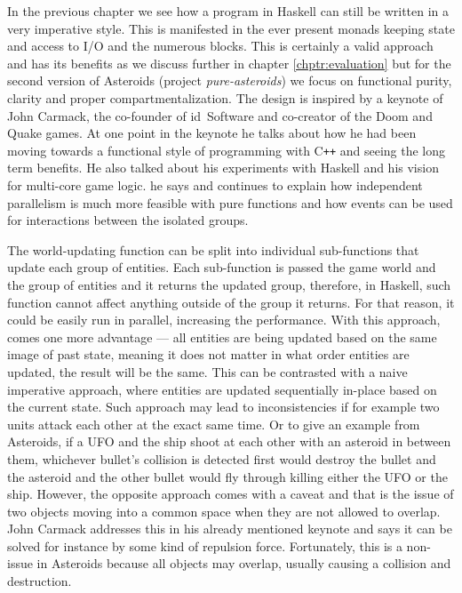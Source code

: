 \documentclass[
  digital, %
  color,   %
  table,   %
  oneside, %
  lof,     %
  lot,     %
]{fithesis3}
\newcommand{\cpp}{C\nolinebreak\texttt{+}\nolinebreak\texttt{+}}
\begin{document}
In the previous chapter we see how a program in Haskell can still be
written in a very imperative style. This is manifested in the ever present
monads keeping state and access to I/O and the numerous  blocks.
This is certainly a valid approach and has its benefits as we discuss
further in chapter \ref{chptr:evaluation} but for the second version of
Asteroids (project \emph{pure-asteroids}) we focus on functional purity,
clarity and proper compartmentalization.
The design is inspired by a keynote\cite{carmackkeynote} of John Carmack, the co-founder
of id~Software and co-creator of the Doom and Quake games.%
At one point in the keynote he talks about how he had been moving towards
a functional style of programming with \cpp{} and seeing the long term benefits.
He also talked about his experiments with Haskell and his vision for multi-core
game logic.  he says and
continues to explain how independent parallelism is much more feasible with pure
functions and how events can be used for interactions between the isolated groups.

The world-updating function can be split into individual sub-functions that update each group
of entities. Each sub-function is passed the game world and the group of entities and
it returns the updated group, therefore, in Haskell, such function cannot affect
anything outside of the group it returns. For that reason, it could be easily run
in parallel, increasing the performance. With this approach, comes one more advantage
--- all entities are being updated based on the same image of past state, meaning
it does not matter in what order entities are updated, the result will be the same.
This can be contrasted with a naive imperative approach, where entities are
updated sequentially in-place based on the current state. Such approach may lead to
inconsistencies if for example two units attack each other at the exact same time.
Or to give an example from Asteroids, if a UFO and the ship shoot at each other
with an asteroid in between them, whichever bullet's collision is detected first
would destroy the bullet and the asteroid and the other bullet would fly through
killing either the UFO or the ship. However, the opposite approach comes with a caveat
and that is the issue of two objects moving into a common space when they are not allowed to overlap.
John Carmack addresses this in his already mentioned keynote\cite{carmackkeynote} and
says it can be solved for instance by some kind of repulsion force. Fortunately, this
is a non-issue in Asteroids because all objects may overlap, usually causing a collision
and destruction.
\end{document}
